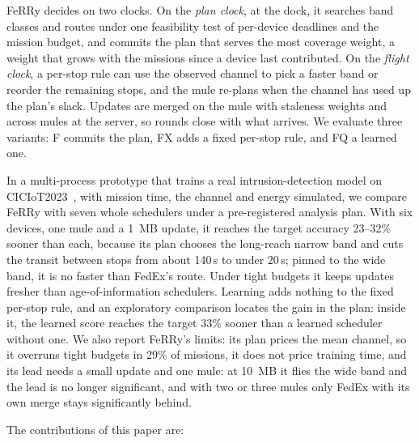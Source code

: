 \documentclass[conference]{IEEEtran}
\newcommand{\sysname}{FeRRy}
\begin{document}
\sysname{} decides on two clocks. On the \emph{plan clock}, at the dock, it
searches band classes and routes under one feasibility test of per-device
deadlines and the mission budget, and commits the plan that serves the most
coverage weight, a weight that grows with the missions since a device last
contributed. On the \emph{flight clock}, a per-stop rule can use the observed
channel to pick a faster band or reorder the remaining stops, and the mule
re-plans when the channel has used up the plan's slack. Updates are merged on
the mule with staleness weights and across mules at the server, so rounds close
with what arrives. We evaluate three variants: F commits the plan, FX adds a
fixed per-stop rule, and FQ a learned one.

In a multi-process prototype that trains a real intrusion-detection model on
CICIoT2023~\cite{CiCIoT2023}, with mission time, the channel and energy
simulated, we compare \sysname{} with seven whole schedulers under a
pre-registered analysis plan. With six devices, one mule and a 1~MB update, it
reaches the
target accuracy 23--32\% sooner than each, because its plan chooses the
long-reach narrow band and cuts the transit between stops from about 140\,s to
under 20\,s; pinned to the wide band, it is no faster than FedEx's route. Under tight
budgets it keeps updates fresher than age-of-information schedulers. Learning
adds nothing to the fixed per-stop rule, and an exploratory comparison locates
the gain in the plan: inside it, the learned score reaches the target 33\%
sooner than a learned scheduler without one. We also report \sysname{}'s limits:
its plan prices the mean channel, so it overruns tight budgets in 29\% of
missions, it does not price training time, and its lead needs a small update and
one mule: at 10~MB it flies the wide band and the lead is no longer significant,
and with two or three mules only FedEx with its own merge stays significantly
behind.

The contributions of this paper are:
\end{document}
